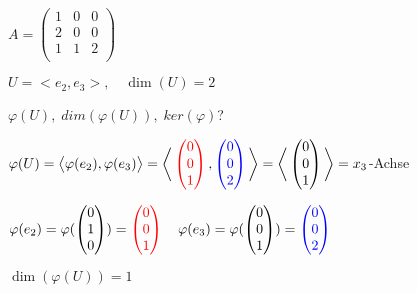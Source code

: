 $
A =
\begin{pmatrix}
1 & 0 & 0 \\
2 & 0 & 0 \\
1 & 1 & 2 \\
\end{pmatrix}
$\bigskip

$U = \big <e_2,e_3\big >, \quad \dim(U) = 2$\bigskip

$\varphi(U),\; dim(\varphi(U)),\; ker(\varphi)$?\bigskip

$\varphi(U) = \big <\varphi(e_2), \varphi(e_3)\big > = \bigg <
\color{red}
\begin{pmatrix}
0\\0\\1
\end{pmatrix}\color{black},\color{blue}
\begin{pmatrix}
0\\0\\2
\end{pmatrix}\color{black}\bigg > = \bigg <
\begin{pmatrix}
0\\0\\1
\end{pmatrix}\bigg > = x_3$-Achse\bigskip

$\varphi(e_2) = \varphi(
\begin{pmatrix}
0\\1\\0
\end{pmatrix}) = \color{red}
\begin{pmatrix}
0\\0\\1
\end{pmatrix} \color{black} \quad
\varphi(e_3) = \varphi(
\begin{pmatrix}
0\\0\\1
\end{pmatrix}) = \color{blue}
\begin{pmatrix}
0\\0\\2
\end{pmatrix}\color{black}$\bigskip

$\dim(\varphi(U)) = 1$
